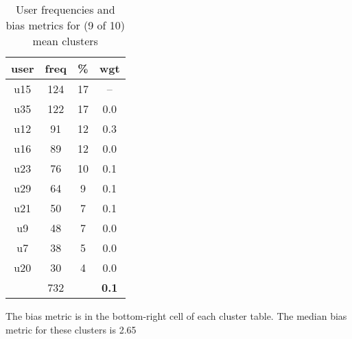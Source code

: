 \begin{appendices}
\begin{table}
\begin{tabular}{ |c|c|c|c| }
	\hline
	\textbf{user} & \textbf{freq} & \textbf{\%} & \textbf{wgt} \\
	\hline
	u15 & 124 & 17 & -- \\
	u35 & 122 & 17 & 0.0 \\
	u12 & 91 & 12 & 0.3 \\
	u16 & 89 & 12 & 0.0 \\
	u23 & 76 & 10 & 0.1 \\
	u29 & 64 & 9 & 0.1 \\
	u21 & 50 & 7 & 0.1 \\
	u9 & 48 & 7 & 0.0 \\
	u7 & 38 & 5 & 0.0 \\
	u20 & 30 & 4 & 0.0 \\
	 & 732 & & \textbf{0.1} \\
	\hline
\end{tabular}
\caption{User frequencies and bias metrics for (9 of 10) mean clusters}
{\small The bias metric is in the bottom-right cell of each cluster table. The median bias metric for these clusters is 2.65}
\end{table}


\end{appendices}
